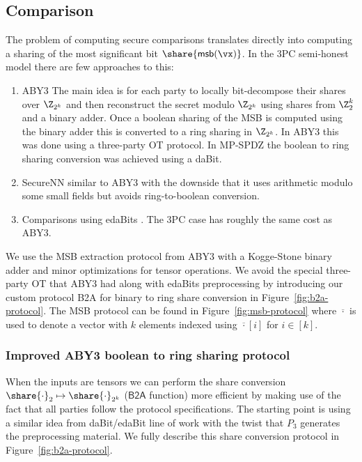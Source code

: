 \subsection{Comparison}


The problem of computing secure comparisons translates directly into computing a sharing of the most significant bit $\share{\mathsf{msb}(\vx)}$.
In the 3PC semi-honest model there are few approaches to this:
\begin{enumerate}
   \item ABY3 \cite{CCS:MohRin18} The main idea is for
   each party to locally bit-decompose their shares over $\Z_{2^k}$ and then
   reconstruct the secret modulo $\Z_{2^k}$ using shares from $\Z^k_2$ and a
   binary adder. Once a boolean sharing of the MSB is computed using the binary adder
   this is converted to a ring sharing in $\Z_{2^k}$.
   In ABY3 this was done using a three-party OT protocol. In MP-SPDZ \cite{CCS:Keller20}
   the boolean to ring sharing conversion was achieved using a daBit.
   \item SecureNN \cite{PoPETS:WagGupCha19}
   similar to ABY3 with the downside that it uses arithmetic modulo
   some small fields but avoids ring-to-boolean conversion.
  \item Comparisons using edaBits \cite{C:EGKRS20}. The 3PC case has roughly the same cost as ABY3.
\end{enumerate}

We use the MSB extraction protocol from ABY3 with a Kogge-Stone binary adder and minor optimizations for tensor operations. We avoid the special three-party OT that ABY3 had along with edaBits preprocessing by introducing our custom protocol \textsf{B2A} for binary to ring share conversion in Figure~\ref{fig:b2a-protocol}.
The MSB protocol can be found in Figure~\ref{fig:msb-protocol} where $\overline{\cdot}$ is used to denote a vector with $k$ elements indexed using $\overline{\cdot}[i]$ for $i \in [k]$.




\subsubsection{Improved ABY3 boolean to ring sharing protocol}
When the inputs are tensors we can perform the share conversion $\share{\cdot}_2
\mapsto \share{\cdot}_{2^k}$ ($\mathsf{B2A}$ function)
more efficient by making use of the fact that all parties
follow the protocol specifications. The starting point is using a similar idea
from daBit/edaBit \cite{INDOCRYPT:RotWoo19,C:EGKRS20}
line of work with the twist that $P_3$ generates the preprocessing
material. We fully describe this share conversion protocol in Figure~\ref{fig:b2a-protocol}.

